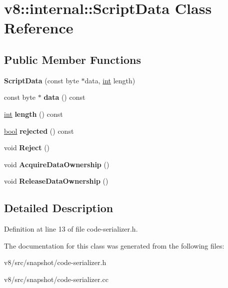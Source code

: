 \hypertarget{classv8_1_1internal_1_1ScriptData}{}\section{v8\+:\+:internal\+:\+:Script\+Data Class Reference}
\label{classv8_1_1internal_1_1ScriptData}
\subsection*{Public Member Functions}
\begin{DoxyCompactItemize}
\item 
\mbox{\label{classv8_1_1internal_1_1ScriptData_af29481a7afc246d1f640209814e10158}} 
{\bfseries Script\+Data} (const byte $\ast$data, \mbox{\hyperlink{classint}{int}} length)
\item 
\mbox{\label{classv8_1_1internal_1_1ScriptData_ad27f0c37ff4df5b7fd0e6215cb149be9}} 
const byte $\ast$ {\bfseries data} () const
\item 
\mbox{\label{classv8_1_1internal_1_1ScriptData_ae4db4f282c417c59a94b259e43a171ab}} 
\mbox{\hyperlink{classint}{int}} {\bfseries length} () const
\item 
\mbox{\label{classv8_1_1internal_1_1ScriptData_ad168a1e9d366626e84f21cab413da918}} 
\mbox{\hyperlink{classbool}{bool}} {\bfseries rejected} () const
\item 
\mbox{\label{classv8_1_1internal_1_1ScriptData_a915eb8d558928bdf0016bf4742283679}} 
void {\bfseries Reject} ()
\item 
\mbox{\label{classv8_1_1internal_1_1ScriptData_a6461a45e69ebeb126945be3a4f28bc8e}} 
void {\bfseries Acquire\+Data\+Ownership} ()
\item 
\mbox{\label{classv8_1_1internal_1_1ScriptData_adeb796cca677fc9bc0f802db04c78778}} 
void {\bfseries Release\+Data\+Ownership} ()
\end{DoxyCompactItemize}


\subsection{Detailed Description}


Definition at line 13 of file code-\/serializer.\+h.



The documentation for this class was generated from the following files\+:\begin{DoxyCompactItemize}
\item 
v8/src/snapshot/code-\/serializer.\+h\item 
v8/src/snapshot/code-\/serializer.\+cc\end{DoxyCompactItemize}
